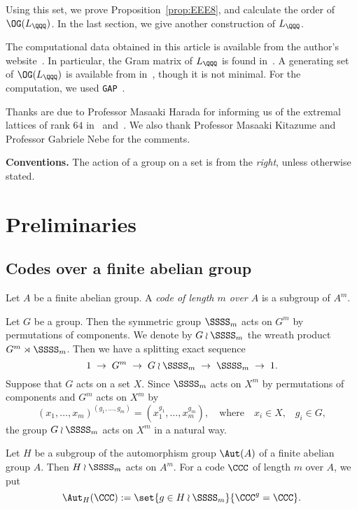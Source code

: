 \documentclass{amsart}
\begin{document}
Using this set, we prove Proposition~\ref{prop:EEE8},
and  calculate the order of $\OG(L_{\QQQ})$.
In the last section,
we give another construction of  $L_{\QQQ}$.
%
\par
The computational data obtained in this article is available from the author's website~\cite{compdata}.
In particular, the Gram matrix of $L_{\QQQ}$  is found in~\cite{compdata}.
A generating set of $\OG(L_{\QQQ})$ is available from  in~\cite{NS},
though it is not minimal.
For the computation,
we used {\tt GAP}~\cite{GAP}. %
%
\par
\medskip
Thanks are due to Professor Masaaki Harada for informing us of the 
extremal lattices of rank $64$ in~\cite{HKO2002} and~\cite{HM2014}.
We also thank Professor Masaaki Kitazume and 
Professor Gabriele Nebe for the comments.
%
\par
\medskip
%
{\bf Conventions.}
The action of a group on a set is from the \emph{right},
unless otherwise stated.
%
%
\section{Preliminaries}\label{sec:pre}
%
\subsection{Codes over a finite abelian group}\label{subsec:code}
%
\begin{definition}
Let $A$ be a finite abelian group.
A \emph{code of length $m$ over $A$} is a subgroup of $A^m$.
\end{definition}
%
Let $G$ be a group.
Then the symmetric group $\SSSS_m$ acts on $G^m$ by permutations of components.
We denote by $G\wr \SSSS_m$ the wreath product 
$G^{m} \rtimes \SSSS_m$.
Then we have a splitting exact sequence
%
\begin{equation}\label{eq:wrexact}
1\;\to\; G^m \;\to\; G\wr \SSSS_m \;\to\; \SSSS_m \;\to\; 1.
\end{equation}
%
Suppose that $G$ acts on a set $X$. %
Since $\SSSS_m$ acts on $X^m$ by permutations of components
and $G^m$ acts on $X^m$ by %
$$
(x_1, \dots, x_m)^{(g_1, \dots, g_m)}=(x_1^{g_1}, \dots, x_m^{g_m}),\quad \textrm{where}\quad x_i\in X,\;\;\; g_i\in G, 
$$
the group $G\wr \SSSS_m$ acts on $X^m$ in a natural way.
\par
Let $H$ be a subgroup of the automorphism group $\Aut(A)$ of a finite abelian group $A$.
Then $H\wr \SSSS_m$ acts on  $A^m$.
For a code $\CCC$  of length $m$ over $A$,
we put
$$
\Aut_{H}(\CCC):=\set{g\in H\wr \SSSS_m}{\CCC^g=\CCC}.
$$
%
\end{document}
